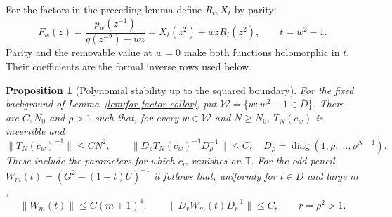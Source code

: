 \documentclass[11pt]{article}
\newtheorem{proposition}{Proposition}[section]
\newcommand{\T}{\mathbb T}
\begin{document}
For the factors in the preceding lemma define $R_t,X_t$ by parity:
\[
 F_w(z)=\frac{p_w(z^{-1})}{g(z^{-2})-wz}
          =X_t(z^2)+wzR_t(z^2),\qquad t=w^2-1.
\]
Parity and the removable value at $w=0$ make both functions
holomorphic in $t$. Their coefficients are the formal inverse rows
used below.

\begin{proposition}[Polynomial stability up to the squared boundary]
\label{prop:boundary-polynomial-stability}
For the fixed background of Lemma~\ref{lem:far-factor-collar}, put
$\mathcal W=\{w:w^2-1\in\overline D\}$.
There are $C,N_0$ and $\rho>1$ such that, for every $w\in\mathcal W$
and $N\ge N_0$, $T_N(c_w)$ is invertible and
\[
 \|T_N(c_w)^{-1}\|\le CN^2,\qquad
 \|D_\rho T_N(c_w)^{-1}D_\rho^{-1}\|\le C,
 \quad D_\rho=\operatorname{diag}(1,\rho,\ldots,\rho^{N-1}).
\]
These include the parameters for which $c_w$ vanishes on $\T$.
For the odd pencil $W_m(t)=(G^2-(1+t)U)^{-1}$ it follows that,
uniformly for $t\in\overline D$ and large $m$,
\begin{equation}\label{eq:boundary-pencil-stability}
 \|W_m(t)\|\le C(m+1)^4,\qquad
 \|D_rW_m(t)D_r^{-1}\|\le C,\qquad r=\rho^2>1.
\end{equation}
\end{proposition}
\end{document}
